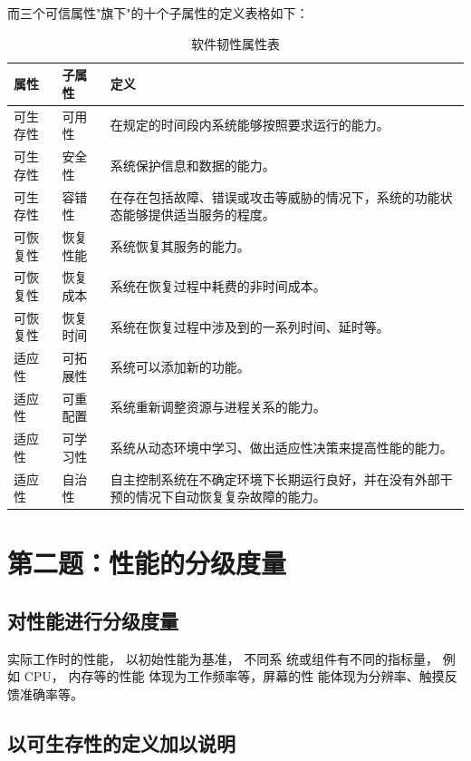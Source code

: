 \documentclass[14pt,a4paper,UTF8,twoside]{article}
\begin{document}
而三个可信属性"旗下"的十个子属性的定义表格如下：

\begin{table}[h]
    \centering
    \renewcommand{\arraystretch}{1.5} %
    \begin{tabular}{|m{3cm}|m{3cm}|m{8cm}|}
    \hline
    \textbf{属性} & \textbf{子属性} & \textbf{定义} \\ \hline
    可生存性 & 可用性 & 在规定的时间段内系统能够按照要求运行的能力。 \\ \hline
    可生存性 & 安全性 & 系统保护信息和数据的能力。 \\ \hline
    可生存性 & 容错性 & 在存在包括故障、错误或攻击等威胁的情况下，系统的功能状态能够提供适当服务的程度。 \\ \hline
    可恢复性 & 恢复性能 & 系统恢复其服务的能力。 \\ \hline
    可恢复性 & 恢复成本 & 系统在恢复过程中耗费的非时间成本。 \\ \hline
    可恢复性 & 恢复时间 & 系统在恢复过程中涉及到的一系列时间、延时等。 \\ \hline
    适应性 & 可拓展性 & 系统可以添加新的功能。 \\ \hline
    适应性 & 可重配置 & 系统重新调整资源与进程关系的能力。 \\ \hline
    适应性 & 可学习性 & 系统从动态环境中学习、做出适应性决策来提高性能的能力。 \\ \hline
    适应性 & 自治性 & 自主控制系统在不确定环境下长期运行良好，并在没有外部干预的情况下自动恢复复杂故障的能力。 \\ \hline
    \end{tabular}
    \caption{软件韧性属性表}
\end{table}

\section{第二题：性能的分级度量}

\subsection{对性能进行分级度量}

实际工作时的性能， 以初始性能为基准，
不同系 统或组件有不同的指标量， 例如 CPU，
内存等的性能 体现为工作频率等，屏幕的性
能体现为分辨率、触摸反馈准确率等。


\subsection{以可生存性的定义加以说明}
\end{document}
